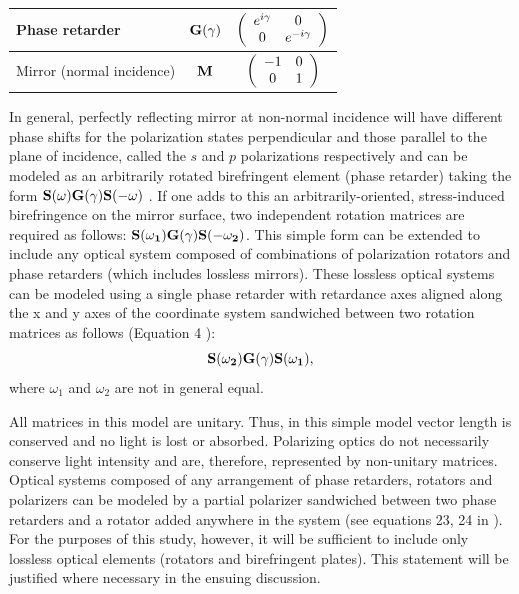 \begin{table}
\begin{center}
\begin{tabular}{|l|c|c|}
Phase retarder&$\bf G(\gamma)$&$\left(\begin{array}{c c}e^{i\gamma}&0\\0&e^{-i\gamma}\end{array}\right)$\\\hline
Mirror (normal incidence)&$\bf M$&$\left(\begin{array}{c c}-1&0\\0&1\end{array}\right)$\\\hline
\end{tabular}
\end{center}
\end{table}

In general, perfectly reflecting  mirror at non-normal incidence will have different phase shifts for the polarization states perpendicular and those parallel to the plane of incidence, called the $s$ and $p$ polarizations respectively and can be modeled as an arbitrarily rotated birefringent element (phase retarder) taking the form ${\bf S(\omega)G(\gamma)S(-\omega)}$ \cite{Vansteenkiste}. If one adds to this an arbitrarily-oriented, stress-induced birefringence on the mirror surface, two independent rotation matrices are required as follows: ${\bf S(\omega_1)G(\gamma)S(-\omega_2)}$. This simple form can be extended to include any optical system composed of combinations of polarization rotators and phase retarders (which includes lossless mirrors). These lossless optical systems can be modeled using a single phase retarder with retardance axes aligned along the x and y axes of the coordinate system sandwiched between two rotation matrices as follows (Equation 4 \cite{Jones2}):
\begin{equation}
{\bf S(\omega_2)G(\gamma)S(\omega_1)},
\label{eq:simple_optics}
\end{equation} 
where $\omega_1$ and $\omega_2$ are not in general equal. 

All matrices in this model are unitary. Thus, in this simple model vector length is conserved and no light is lost or absorbed. Polarizing optics do not necessarily conserve light intensity and are, therefore, represented by non-unitary matrices. Optical systems composed of any arrangement of phase retarders, rotators and polarizers can be modeled by a partial polarizer sandwiched between two phase retarders and a rotator added anywhere in the system (see equations 23, 24 in \cite{Jones2}). For the purposes of this study, however, it will be sufficient to include only lossless optical elements (rotators and birefringent plates). This statement will be justified where necessary in the ensuing discussion.  

